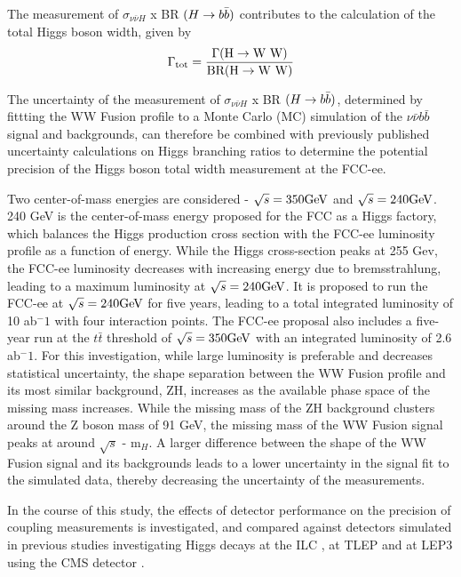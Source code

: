 \documentclass[preprintnumbers,nofootinbib,noshowpacs,eqsecnum,prd,superscriptaddress,letterpaper]{revtex4}
\begin{document}
The measurement of $\sigma_{\nu\bar{\nu}H}$ x BR $(H \rightarrow b\bar{b})$ contributes to the calculation of the total Higgs boson width, given by
\begin{equation}
	\Gamma_\text{tot} = \frac{\Gamma(\text{H}\rightarrow\text{W W})}{\text{BR}(\text{H}\rightarrow\text{W W})}
\end{equation}

The uncertainty of the measurement of $\sigma_{\nu\bar{\nu}H}$ x BR $(H \rightarrow b\bar{b})$, determined by fittting the WW Fusion profile to a Monte Carlo (MC) simulation of the $\nu\bar{\nu}b\bar{b}$ signal and backgrounds, can therefore be combined with previously published uncertainty calculations on Higgs branching ratios to determine the potential precision of the Higgs boson total width measurement at the FCC-ee.

Two center-of-mass energies are considered - $\sqrt{s} = 350 \text{GeV}$ and $\sqrt{s} = 240 \text{GeV}$. 240 GeV is the center-of-mass energy proposed for the FCC as a Higgs factory, which balances the Higgs production cross section with the FCC-ee luminosity profile as a function of energy. While the Higgs cross-section peaks at 255 Gev, the FCC-ee luminosity decreases with increasing energy due to bremsstrahlung, leading to a maximum luminosity at $\sqrt{s} = 240 \text{GeV}$. It is proposed to run the FCC-ee at $\sqrt{s} = 240 \text{GeV}$ for five years, leading to a total integrated luminosity of 10 ab$^-1$ with four interaction points. The FCC-ee proposal also includes a five-year run at the $t\bar{t}$ threshold of $\sqrt{s} = 350 \text{GeV}$ with an integrated luminosity of 2.6 ab$^-1$. For this investigation, while large luminosity is preferable and decreases statistical uncertainty, the shape separation between the WW Fusion profile and its most similar background, ZH, increases as the available phase space of the missing mass increases. While the missing mass of the ZH background clusters around the Z boson mass of 91 GeV, the missing mass of the WW Fusion signal peaks at around $\sqrt{s}$ - m$_{H}$. A larger difference between the shape of the WW Fusion signal and its backgrounds leads to a lower uncertainty in the signal fit to the simulated data, thereby decreasing the uncertainty of the measurements. 

In the course of this study, the effects of detector performance on the precision of coupling measurements is investigated, and compared against detectors simulated in previous studies investigating Higgs decays at the ILC \cite{Higgs ILC}, at TLEP \cite{TLEP} and at LEP3 using the CMS detector \cite{lep3}.
\end{document}
